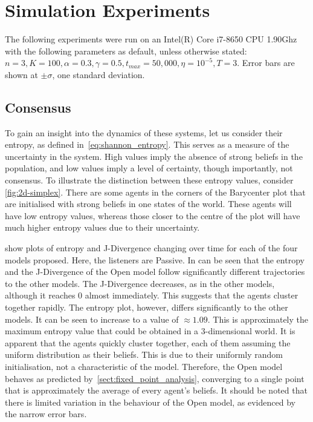 \section{Simulation Experiments}

The following experiments were run on an Intel(R) Core i7-8650 CPU 1.90Ghz with the following parameters as default, unless otherwise stated: $n=3, K=100, \alpha = 0.3, \gamma = 0.5, t_{max} = 50,000, \eta = 10^{-5}, T=3$. Error bars are shown at $\pm \sigma$, one standard deviation. 
\subsection{Consensus}

To gain an insight into the dynamics of these systems, let us consider their entropy, as defined in~\cref{eq:shannon_entropy}. This serves as a measure of the uncertainty in the system. High values imply the absence of strong beliefs in the population, and low values imply a level of certainty, though importantly, not consensus. To illustrate the distinction between these entropy values, consider \cref{fig:2d-simplex}. There are some agents in the corners of the Barycenter plot that are initialised with strong beliefs in one states of the world. These agents will have low entropy values, whereas those closer to the centre of the plot will have much higher entropy values due to their uncertainty. 


 show plots of entropy and J-Divergence changing over time for each of the four models proposed. Here, the listeners are Passive. In can be seen that the entropy and the J-Divergence of the Open model follow significantly different trajectories to the other models. The J-Divergence decreases, as in the other models, although it reaches $0$ almost immediately. This suggests that the agents cluster together rapidly. The entropy plot, however, differs significantly to the other models. It can be seen to increase to a value of $\approx 1.09$. This is approximately the maximum entropy value that could be obtained in a $3$-dimensional world. It is apparent that the agents quickly cluster together, each of them assuming the uniform distribution as their beliefs. This is due to their uniformly random initialisation, not a characteristic of the model. Therefore, the Open model behaves as predicted by~\cref{sect:fixed_point_analysis}, converging to a single point that is approximately the average of every agent's beliefs. It should be noted that there is limited variation in the behaviour of the Open model, as evidenced by the narrow error bars. 

